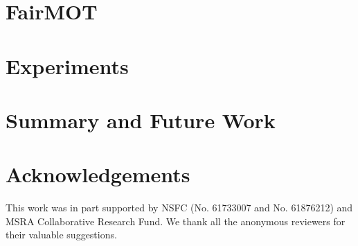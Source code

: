 \section{FairMOT}


\section{Experiments}


\section{Summary and Future Work}


\section*{Acknowledgements}
This work was in part supported by NSFC (No. 61733007 and No. 61876212) and MSRA Collaborative Research Fund. We thank all the anonymous reviewers for their valuable suggestions.









         
